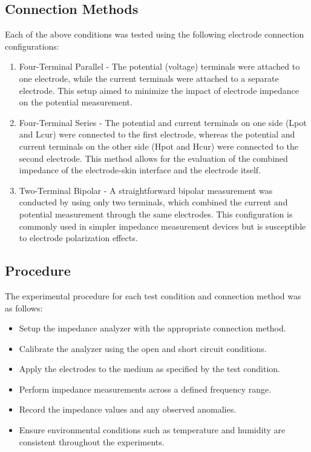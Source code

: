 \subsection{Connection Methods}
Each of the above conditions was tested using the following electrode connection configurations:
\begin{enumerate}
    \item Four-Terminal Parallel - The potential (voltage) terminals were attached to one electrode, while the current terminals were attached to a separate electrode. This setup aimed to minimize the impact of electrode impedance on the potential measurement.
    \item Four-Terminal Series - The potential and current terminals on one side (Lpot and Lcur) were connected to the first electrode, whereas the potential and current terminals on the other side (Hpot and Hcur) were connected to the second electrode. This method allows for the evaluation of the combined impedance of the electrode-skin interface and the electrode itself.
    \item Two-Terminal Bipolar - A straightforward bipolar measurement was conducted by using only two terminals, which combined the current and potential measurement through the same electrodes. This configuration is commonly used in simpler impedance measurement devices but is susceptible to electrode polarization effects.
\end{enumerate}

\subsection{Procedure}
The experimental procedure for each test condition and connection method was as follows:
\begin{itemize}
    \item Setup the impedance analyzer with the appropriate connection method.
    \item Calibrate the analyzer using the open and short circuit conditions.
    \item Apply the electrodes to the medium as specified by the test condition.
    \item Perform impedance measurements across a defined frequency range.
    \item Record the impedance values and any observed anomalies.
    \item Ensure environmental conditions such as temperature and humidity are consistent throughout the experiments.
\end{itemize}

